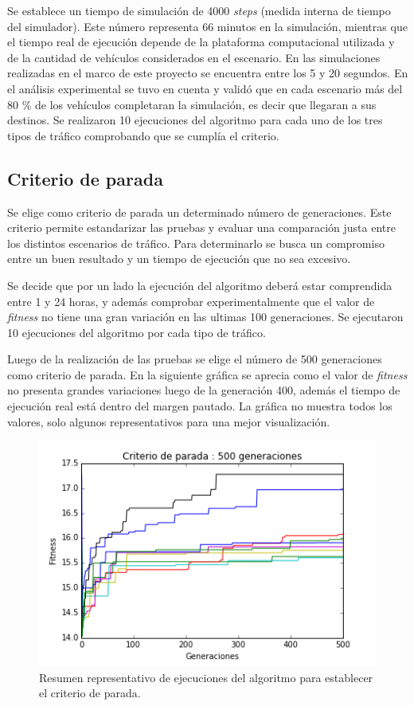 Se establece un tiempo de simulación de 4000 \emph{steps} (medida interna de tiempo del simulador). Este número representa 66 minutos en la simulación, mientras que el tiempo real de ejecución depende de la plataforma computacional utilizada y de la cantidad de vehículos considerados en el escenario. En las simulaciones realizadas en el marco de este proyecto se encuentra entre los 5 y 20 segundos. En el análisis experimental se tuvo en cuenta y validó que en cada escenario más del 80 \% de los vehículos completaran la simulación, es decir que llegaran a sus destinos. Se realizaron 10 ejecuciones del algoritmo para cada uno de los tres tipos de tráfico comprobando que se cumplía el criterio.


\subsection{Criterio de parada}
Se elige como criterio de parada un determinado número de generaciones. Este criterio permite estandarizar las pruebas y evaluar una comparación justa entre los distintos escenarios de tráfico. Para determinarlo se busca un compromiso entre un buen resultado y un tiempo de ejecución que no sea excesivo.

Se decide que por un lado la ejecución del algoritmo deberá estar comprendida entre 1 y 24 horas, y además comprobar experimentalmente que el valor de \emph{fitness} no tiene una gran variación en las ultimas 100 generaciones. Se ejecutaron 10 ejecuciones del algoritmo por cada tipo de tráfico.

Luego de la realización de las pruebas se elige el número de 500 generaciones como criterio de parada.
En la siguiente gráfica se aprecia como el valor de \emph{fitness} no presenta grandes variaciones luego de la generación 400, además el tiempo de ejecución real está dentro del margen pautado. La gráfica no muestra todos los valores, solo algunos representativos para una mejor visualización.



\begin{figure}[h]
\centering
\includegraphics[width=0.8\linewidth]{Figures/criterio_parada}
\caption{Resumen representativo de ejecuciones del algoritmo para establecer el criterio de parada.}
\label{fig:criterio_parada}
\end{figure}



